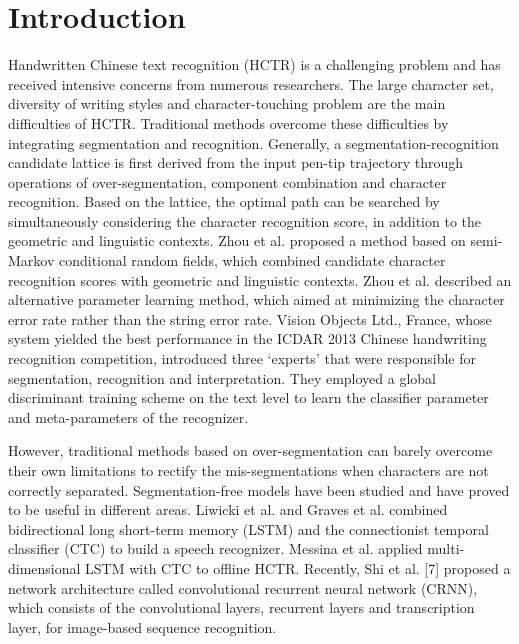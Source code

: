 \documentclass[10pt,conference,a4paper]{IEEEtran}
\begin{document}
\section{Introduction}
Handwritten Chinese text recognition (HCTR) is a challenging problem and has received intensive concerns from numerous researchers.
The large character set, diversity of writing styles and character-touching problem are the main difficulties of HCTR.
Traditional methods\cite{zhou2013handwritten}\cite{zhou2014minimum} overcome these difficulties by integrating segmentation and recognition.
Generally, a segmentation-recognition candidate lattice\cite{zhou2013handwritten} is first derived from the input pen-tip trajectory through operations of over-segmentation, component combination and character recognition.
Based on the lattice, the optimal path can be searched by simultaneously considering the character recognition score, in addition to the geometric and linguistic contexts.
Zhou et al.\cite{zhou2013handwritten} proposed a method based on semi-Markov conditional random fields, which combined candidate character recognition scores with geometric and linguistic contexts.
Zhou et al.\cite{zhou2014minimum} described an alternative parameter learning method, which aimed at minimizing the character error rate rather than the string error rate.
Vision Objects Ltd., France, whose system yielded the best performance in the ICDAR 2013 Chinese handwriting recognition competition\cite{yin2013icdar}, introduced three `experts' that were responsible for segmentation, recognition and interpretation.
They employed a global discriminant training scheme on the text level to learn the classifier parameter and meta-parameters of the recognizer.


However, traditional methods based on over-segmentation can barely overcome their own limitations to rectify the mis-segmentations when characters are not correctly separated.
Segmentation-free models\cite{liwicki2007novel,graves2009novel,messina2015segmentation,shi2015end,he2015reading}
have been studied and have proved to be useful in different areas.
Liwicki et al.\cite{liwicki2007novel} and Graves et al.\cite{graves2009novel} combined bidirectional long short-term memory (LSTM) and the connectionist temporal classifier (CTC) to build a speech recognizer.
Messina et al.\cite{messina2015segmentation} applied multi-dimensional LSTM with CTC to offline HCTR.
Recently, Shi et al. [7] proposed a network architecture called convolutional recurrent neural network (CRNN), which consists of the convolutional layers, recurrent layers and transcription layer, for image-based sequence recognition.
\end{document}
